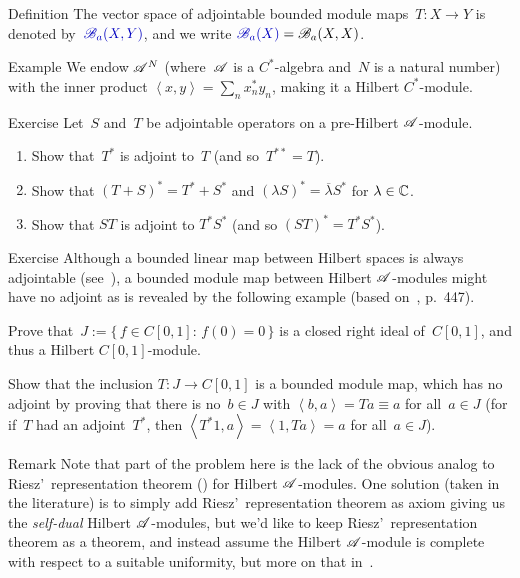 \documentclass[a]{subfiles}
\begin{document}
\begin{parsec}
\begin{point}{Definition}
The vector space of adjointable bounded module maps~$T\colon X\to Y$ 
is denoted
by~$\Define{\scrB_a(X,Y)}$,
and we write $\Define{\scrB_a(X)}=\scrB_a(X,X)$.
\end{point}
\begin{point}{Example}%
We endow $\mathscr{A}^N$
(where~$\mathscr{A}$ is a $C^*$-algebra and~$N$ is a natural number)
with the inner product $\left<x,y\right>=\sum_n x_n^*y_n$,
making it a Hilbert $C^*$-module.
\end{point}
\begin{point}{Exercise}%
Let~$S$ and~$T$ be adjointable operators on a 
pre-Hilbert $\mathscr{A}$-module.
\begin{enumerate}
\item
	Show that~$T^*$ is adjoint to~$T$ (and so~$T^{**}=T$).
\item
Show that $(T+S)^*=T^*+S^*$ 
and $(\lambda S)^*=\overline{\lambda}S^*$ for $\lambda\in \mathbb{C}$.
\item
Show that $ST$ is adjoint to $T^*S^*$
(and so $(ST)^*=T^*S^*$).
\end{enumerate}
\end{point}
\begin{point}{Exercise}%
Although a bounded linear map between Hilbert spaces
is always adjointable (see~),
a bounded module map
between Hilbert $\mathscr{A}$-modules
might have no adjoint
as is revealed by the following example
(based on~\cite{paschke}, p.~447).

Prove that~$J:=\{\,f\in C[0,1]\colon\, f(0)=0\,\}$
is a closed right ideal of~$C[0,1]$, and thus a
Hilbert $C[0,1]$-module.

Show that the inclusion $T\colon J\to C[0,1]$
is a bounded module map,
which has no adjoint
by proving that there is no~$b\in J$
with $\left<b,a\right>=Ta\equiv a$ for all~$a\in J$
(for if~$T$ had an adjoint~$T^*$,
then $\left<T^*1,a\right>=\left<1,Ta\right>=a$
for all~$a\in J$).

\begin{point}{Remark}%
Note that part of the problem here is the lack 
of the obvious analog to
Riesz'~representation theorem ()  
for Hilbert $\mathscr{A}$-modules.
One solution (taken in the literature) is to simply 
add Riesz'~representation theorem as axiom
giving us the \emph{self-dual} Hilbert $\mathscr{A}$-modules,
but we'd like to keep Riesz'~representation theorem as a theorem,
and instead assume the Hilbert $\mathscr{A}$-module
is complete with respect to a suitable uniformity,
but more on that in~\sref{}.


\end{point}
\end{point}
\end{parsec}
\end{document}
